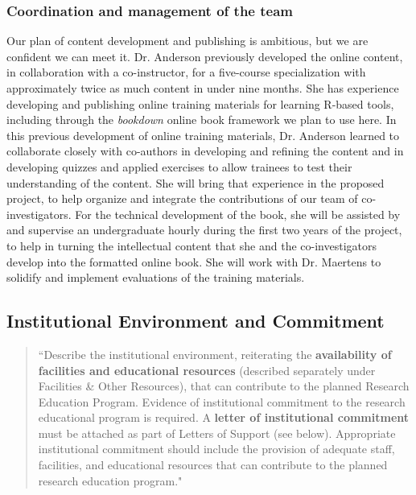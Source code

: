 \documentclass[pdftex,english,11pt,parskip=half]{scrartcl}
\begin{document}
\subsubsection*{Coordination and management of the team}

Our plan of content development and publishing is ambitious, but we are confident we can meet it. Dr. Anderson previously developed the online content, in collaboration with a co-instructor, for a five-course specialization with approximately twice as much content in under nine months. She has experience developing and publishing online training materials for learning R-based tools, including through the \textit{bookdown} online book framework we plan to use here. In this previous development of online training materials, Dr. Anderson learned to collaborate closely with co-authors in developing and refining the content and in developing quizzes and applied exercises to allow trainees to test their understanding of the content. She will bring that experience in the proposed project, to help organize and integrate the contributions of our team of co-investigators. For the technical development of the book, she will be assisted by and supervise an undergraduate hourly during the first two years of the project, to help in turning the intellectual content that she and the co-investigators develop into the formatted online book. She will work with Dr. Maertens to solidify and implement evaluations of the training materials.

\subsection{Institutional Environment and Commitment}

\begin{quotation}
``Describe the institutional environment, reiterating the \textbf{availability of facilities and educational resources} (described separately under Facilities \& Other Resources), that can contribute to the planned Research Education Program. Evidence of institutional commitment to the research educational program is required. A \textbf{letter of institutional commitment} must be attached as part of Letters of Support (see below). Appropriate institutional commitment should include the provision of adequate staff, facilities, and educational resources that can contribute to the planned research education program."
\end{quotation}
\end{document}
